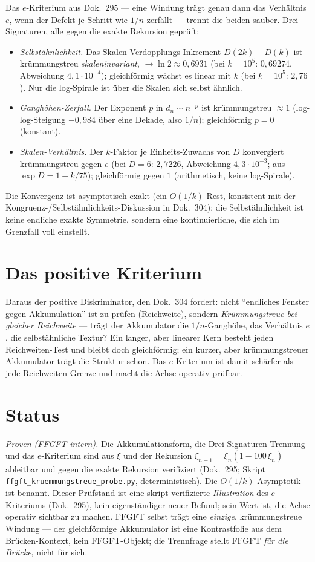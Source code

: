 Das $e$-Kriterium aus Dok.~295 --- eine Windung trägt genau dann das Verhältnis $e$, wenn der
Defekt je Schritt wie $1/n$ zerfällt --- trennt die beiden sauber. Drei Signaturen, alle gegen
die exakte Rekursion geprüft:
\begin{itemize}
\item \emph{Selbstähnlichkeit.} Das Skalen-Verdopplungs-Inkrement $D(2k)-D(k)$ ist
krümmungstreu \emph{skaleninvariant}, $\to\ln 2\approx0{,}6931$ (bei $k=10^5$: $0{,}69274$,
Abweichung $4{,}1\cdot10^{-4}$); gleichförmig wächst es linear mit $k$ (bei $k=10^5$:
$2{,}76$). Nur die log-Spirale ist über die Skalen sich selbst ähnlich.
\item \emph{Ganghöhen-Zerfall.} Der Exponent $p$ in $d_n\sim n^{-p}$ ist krümmungstreu
$\approx1$ (log-log-Steigung $-0{,}984$ über eine Dekade, also $1/n$); gleichförmig $p=0$
(konstant).
\item \emph{Skalen-Verhältnis.} Der $k$-Faktor je Einheits-Zuwachs von $D$ konvergiert
krümmungstreu gegen $e$ (bei $D=6$: $2{,}7226$, Abweichung $4{,}3\cdot10^{-3}$; aus
$\exp D=1+k/75$); gleichförmig gegen $1$ (arithmetisch, keine log-Spirale).
\end{itemize}
Die Konvergenz ist asymptotisch exakt (ein $O(1/k)$-Rest, konsistent mit der
Kongruenz-/Selbstähnlichkeits-Diskussion in Dok.~304): die Selbstähnlichkeit ist keine endliche
exakte Symmetrie, sondern eine kontinuierliche, die sich im Grenzfall voll einstellt.

\section{Das positive Kriterium}

Daraus der positive Diskriminator, den Dok.~304 fordert: nicht \enquote{endliches Fenster gegen
Akkumulation} ist zu prüfen (Reichweite), sondern \emph{Krümmungstreue bei gleicher Reichweite}
--- trägt der Akkumulator die $1/n$-Ganghöhe, das Verhältnis $e$, die selbstähnliche Textur?
Ein langer, aber linearer Kern besteht jeden Reichweiten-Test und bleibt doch gleichförmig; ein
kurzer, aber krümmungstreuer Akkumulator trägt die Struktur schon. Das $e$-Kriterium ist damit
schärfer als jede Reichweiten-Grenze und macht die Achse operativ prüfbar.

\section{Status}

\emph{Proven (FFGFT-intern).} Die Akkumulationsform, die Drei-Signaturen-Trennung und das
$e$-Kriterium sind aus $\xi$ und der Rekursion $\xi_{n+1}=\xi_n(1-100\,\xi_n)$ ableitbar und
gegen die exakte Rekursion verifiziert (Dok.~295; Skript \texttt{ffgft\_kruemmungstreue\_probe.py},
deterministisch). Die $O(1/k)$-Asymptotik ist benannt. Dieser Prüfstand ist eine skript-verifizierte \emph{Illustration} des $e$-Kriteriums (Dok.~295), kein eigenständiger neuer Befund; sein Wert ist, die Achse operativ sichtbar zu machen. FFGFT selbst trägt eine \emph{einzige}, krümmungstreue Windung --- der gleichförmige Akkumulator ist eine Kontrastfolie aus dem Brücken-Kontext, kein FFGFT-Objekt; die Trennfrage stellt FFGFT \emph{für die Brücke}, nicht für sich.

